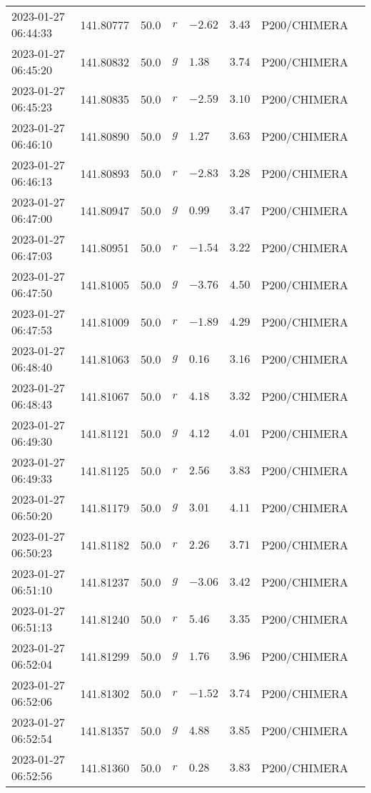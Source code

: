 \documentclass{nature_plusfigure}
\begin{document}
\begin{supplement}
\begin{center}
\begin{longtable}{llllllll}
2023-01-27 06:44:33 & 141.80777 & 50.0 & $r$ & $-2.62$ & $3.43$ & P200/CHIMERA &  \\ 
2023-01-27 06:45:20 & 141.80832 & 50.0 & $g$ & $1.38$ & $3.74$ & P200/CHIMERA &  \\ 
2023-01-27 06:45:23 & 141.80835 & 50.0 & $r$ & $-2.59$ & $3.10$ & P200/CHIMERA &  \\ 
2023-01-27 06:46:10 & 141.80890 & 50.0 & $g$ & $1.27$ & $3.63$ & P200/CHIMERA &  \\ 
2023-01-27 06:46:13 & 141.80893 & 50.0 & $r$ & $-2.83$ & $3.28$ & P200/CHIMERA &  \\ 
2023-01-27 06:47:00 & 141.80947 & 50.0 & $g$ & $0.99$ & $3.47$ & P200/CHIMERA &  \\ 
2023-01-27 06:47:03 & 141.80951 & 50.0 & $r$ & $-1.54$ & $3.22$ & P200/CHIMERA &  \\ 
2023-01-27 06:47:50 & 141.81005 & 50.0 & $g$ & $-3.76$ & $4.50$ & P200/CHIMERA &  \\ 
2023-01-27 06:47:53 & 141.81009 & 50.0 & $r$ & $-1.89$ & $4.29$ & P200/CHIMERA &  \\ 
2023-01-27 06:48:40 & 141.81063 & 50.0 & $g$ & $0.16$ & $3.16$ & P200/CHIMERA &  \\ 
2023-01-27 06:48:43 & 141.81067 & 50.0 & $r$ & $4.18$ & $3.32$ & P200/CHIMERA &  \\ 
2023-01-27 06:49:30 & 141.81121 & 50.0 & $g$ & $4.12$ & $4.01$ & P200/CHIMERA &  \\ 
2023-01-27 06:49:33 & 141.81125 & 50.0 & $r$ & $2.56$ & $3.83$ & P200/CHIMERA &  \\ 
2023-01-27 06:50:20 & 141.81179 & 50.0 & $g$ & $3.01$ & $4.11$ & P200/CHIMERA &  \\ 
2023-01-27 06:50:23 & 141.81182 & 50.0 & $r$ & $2.26$ & $3.71$ & P200/CHIMERA &  \\ 
2023-01-27 06:51:10 & 141.81237 & 50.0 & $g$ & $-3.06$ & $3.42$ & P200/CHIMERA &  \\ 
2023-01-27 06:51:13 & 141.81240 & 50.0 & $r$ & $5.46$ & $3.35$ & P200/CHIMERA &  \\ 
2023-01-27 06:52:04 & 141.81299 & 50.0 & $g$ & $1.76$ & $3.96$ & P200/CHIMERA &  \\ 
2023-01-27 06:52:06 & 141.81302 & 50.0 & $r$ & $-1.52$ & $3.74$ & P200/CHIMERA &  \\ 
2023-01-27 06:52:54 & 141.81357 & 50.0 & $g$ & $4.88$ & $3.85$ & P200/CHIMERA &  \\ 
2023-01-27 06:52:56 & 141.81360 & 50.0 & $r$ & $0.28$ & $3.83$ & P200/CHIMERA &  \\ 

\end{longtable}
\end{center}
\end{supplement}
\end{document}
